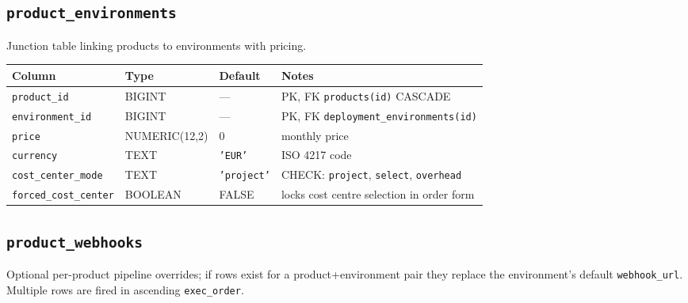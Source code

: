 \documentclass[12pt,a4paper,twoside]{report}
\newcommand{\code}[1]{\texttt{#1}}
\begin{document}
\subsection*{\texttt{product\_environments}}

Junction table linking products to environments with pricing.

\begin{table}[H]
  \centering\small
  \begin{tabular}{@{}llll@{}}
    \toprule
    \textbf{Column} & \textbf{Type} & \textbf{Default} & \textbf{Notes} \\
    \midrule
    \code{product\_id}        & BIGINT        & ---          & PK, FK \textrightarrow{} \code{products(id)} CASCADE \\
    \code{environment\_id}    & BIGINT        & ---          & PK, FK \textrightarrow{} \code{deployment\_environments(id)} \\
    \code{price}              & NUMERIC(12,2) & 0            & monthly price \\
    \code{currency}           & TEXT          & \code{'EUR'} & ISO 4217 code \\
    \code{cost\_center\_mode} & TEXT          & \code{'project'} & CHECK: \code{project}, \code{select}, \code{overhead} \\
    \code{forced\_cost\_center}& BOOLEAN      & FALSE        & locks cost centre selection in order form \\
    \bottomrule
  \end{tabular}
\end{table}

\subsection*{\texttt{product\_webhooks}}

Optional per-product pipeline overrides; if rows exist for a
product+environment pair they replace the environment's default
\code{webhook\_url}.  Multiple rows are fired in ascending
\code{exec\_order}.
\end{document}
